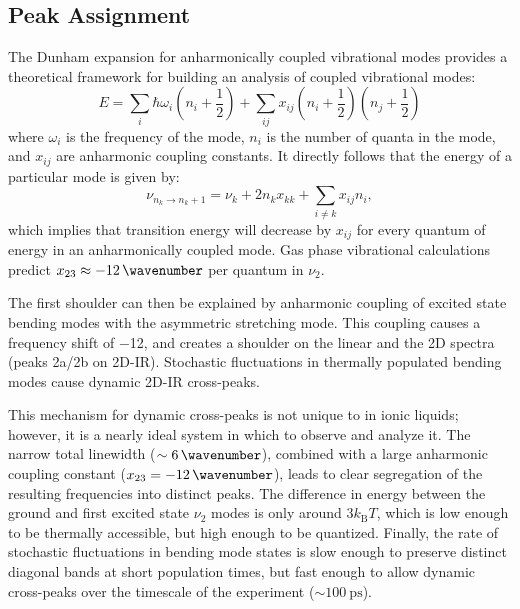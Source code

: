 {\subsection{Peak Assignment}
\label{sec:nu3_assignment}
The Dunham expansion for anharmonically coupled vibrational modes provides a theoretical framework for building an analysis of coupled vibrational modes:
\begin{equation}
  \label{eq:Dunham expansion}
  E = \sum_{i} \hbar \omega_i \left( n_i + \frac{1}{2} \right) + \sum_{ij} x_{ij} \left( n_i + \frac{1}{2} \right) \left( n_j + \frac{1}{2} \right)
\end{equation}
where $\omega_i$ is the frequency of the mode, $n_i$ is the number of quanta in the mode, and $x_{ij}$ are anharmonic coupling constants. It directly follows that the energy of a particular mode is given by:
\begin{equation}
  \label{eq:anh_coupled_energy}
  \nu_{n_k \rightarrow n_k + 1} = \nu_k + 2n_{k}x_{kk} + \sum_{i \neq k} x_{ij}n_{i},
\end{equation}
which implies that transition energy will decrease by \(x_{ij}\) for every quantum of energy in an anharmonically coupled mode.\cite{Botan2008} Gas phase vibrational calculations predict \(x_{23} \approx \SI{-12}{\wavenumber}\) per quantum in \(\nu_2\).\cite{Taylor1993,Dressier1997}

The first shoulder can then be explained by anharmonic coupling of excited state bending modes with the asymmetric stretching mode. This coupling causes a frequency shift of \SI{-12}{\wavenumber}, and creates a shoulder on the linear and the 2D spectra (peaks 2a/2b on 2D-IR). Stochastic fluctuations in thermally populated bending modes cause dynamic 2D-IR cross-peaks.

This mechanism for dynamic cross-peaks is not unique to  in ionic liquids; however, it is a nearly ideal system in which to observe and analyze it. The narrow total linewidth (\(\sim \SI{6}{\wavenumber}\)), combined with a large anharmonic coupling constant (\(x_{23} = \SI{-12}{\wavenumber}\)), leads to clear segregation of the resulting frequencies into distinct peaks. The difference in energy between the ground and first excited state \(\nu_2\) modes is only around \(3k_{\textrm{B}}T\), which is low enough to be thermally accessible, but high enough to be quantized. Finally, the rate of stochastic fluctuations in bending mode states is slow enough to preserve distinct diagonal bands at short population times, but fast enough to allow dynamic cross-peaks over the timescale of the experiment (\(\sim \SI{100}{\ps}\)).

}
